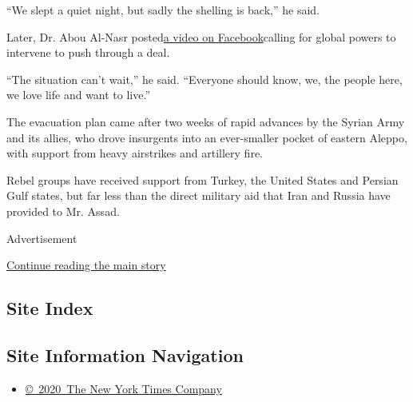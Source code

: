 ``We slept a quiet night, but sadly the shelling is back,'' he said.

Later, Dr. Abou Al-Nasr
posted\href{https://www.facebookcorewwwi.onion/groups/InstantReportingTeam/permalink/611719489014616/}{a
video on Facebook}calling for global powers to intervene to push through
a deal.

``The situation can't wait,'' he said. ``Everyone should know, we, the
people here, we love life and want to live.''

The evacuation plan came after two weeks of rapid advances by the Syrian
Army and its allies, who drove insurgents into an ever-smaller pocket of
eastern Aleppo, with support from heavy airstrikes and artillery fire.

Rebel groups have received support from Turkey, the United States and
Persian Gulf states, but far less than the direct military aid that Iran
and Russia have provided to Mr. Assad.

Advertisement

\protect\hyperlink{after-bottom}{Continue reading the main story}

\hypertarget{site-index}{%
\subsection{Site Index}\label{site-index}}

\hypertarget{site-information-navigation}{%
\subsection{Site Information
Navigation}\label{site-information-navigation}}

\begin{itemize}
\tightlist
\item
  \href{https://help.nytimes3xbfgragh.onion/hc/en-us/articles/115014792127-Copyright-notice}{©~2020~The
  New York Times Company}
\end{itemize}


